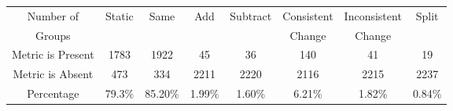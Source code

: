 \begin{table}[htbp]
\vspace{0.5em}\centering\wuhao
\begin{tabular}{cccccccc}
\toprule[1.5pt]
Number of&\multirow{2}{*}{Static}&\multirow{2}{*}{Same}&\multirow{2}{*}{Add}&\multirow{2}{*}{Subtract}&Consistent&Inconsistent&\multirow{2}{*}{Split}\\ 
Groups&&&&&Change&Change&\\ 
\midrule[1pt]
Metric is Present	&1783	&1922	&45	&36	&140	&41	&19\\ 
Metric is Absent	&473	&334	&2211	&2220	&2116	&2215	&2237\\ 
Percentage	&79.3\%	&85.20\%	&1.99\%	&1.60\%	&6.21\%	&1.82\%	&0.84\%\\ 
\bottomrule[1.5pt]
\end{tabular}
\end{table}


